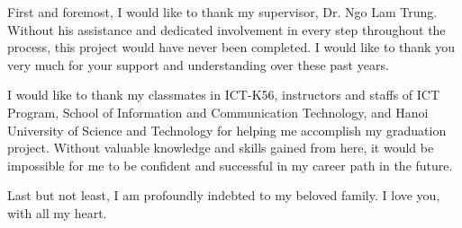 \begin{acknowledgement}
First and foremost, I would like to thank my supervisor, Dr. Ngo Lam Trung. Without his assistance and dedicated involvement in every step throughout the process, this project would have never been completed. I would like to thank you very much for your support and understanding over these past years.

I would like to thank my classmates in ICT-K56, instructors and staffs of ICT Program, School of Information and Communication Technology, and Hanoi University of Science and Technology for helping me accomplish my graduation project. Without valuable knowledge and skills gained from here, it would be impossible for me to be confident and successful in my career path in the future.

Last but not least, I am profoundly indebted to my beloved family. I love you, with all my heart.

\end{acknowledgement}